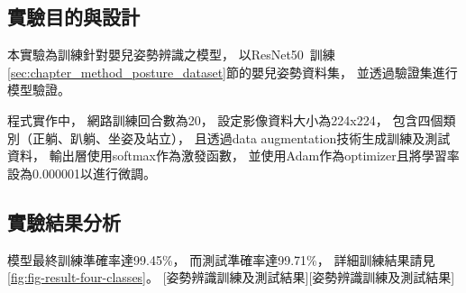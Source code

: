 \documentclass[class=NCU_thesis, crop=false]{standalone}
\begin{document}
\subsection{實驗目的與設計}
本實驗為訓練針對嬰兒姿勢辨識之模型，
以ResNet50~\cite{he_deep_2016}訓練\ref{sec:chapter_method_posture_dataset}節的嬰兒姿勢資料集，
並透過驗證集進行模型驗證。

程式實作中，
網路訓練回合數為20，
設定影像資料大小為224x224，
包含四個類別（正躺、趴躺、坐姿及站立），
且透過data augmentation技術生成訓練及測試資料，
輸出層使用softmax作為激發函數，
並使用Adam作為optimizer且將學習率設為0.000001以進行微調。

\subsection{實驗結果分析}
模型最終訓練準確率達99.45\%，
而測試準確率達99.71\%，
詳細訓練結果請見\cref{fig:fig-result-four-classes}。
[姿勢辨識訓練及測試結果][姿勢辨識訓練及測試結果]
\end{document}
